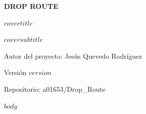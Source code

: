 \documentclass[a4paper,11pt]{article}
\begin{document}
\begin{titlepage}
\thispagestyle{empty}
\pagecolor{navybg}
\color{white}
\vspace*{3cm}
\begin{center}
{\sffamily\bfseries\fontsize{16}{19}\selectfont\color{amber} DROP ROUTE\par}
\vspace{1.4cm}
{\sffamily\bfseries\fontsize{30}{38}\selectfont $covertitle$\par}
\vspace{0.8cm}
{\sffamily\fontsize{14}{20}\selectfont\color{lightblue} $coversubtitle$\par}
\vfill
{\sffamily\small Autor del proyecto: Jesús Quevedo Rodríguez\par}
{\sffamily\small Versión $version$\par}
{\sffamily\small Repositorio: a01653/Drop\_Route\par}
\vspace{2cm}
\end{center}
\end{titlepage}
\nopagecolor
\restoregeometry
\setcounter{page}{2}
\tableofcontents
\newpage
$body$
\end{document}
